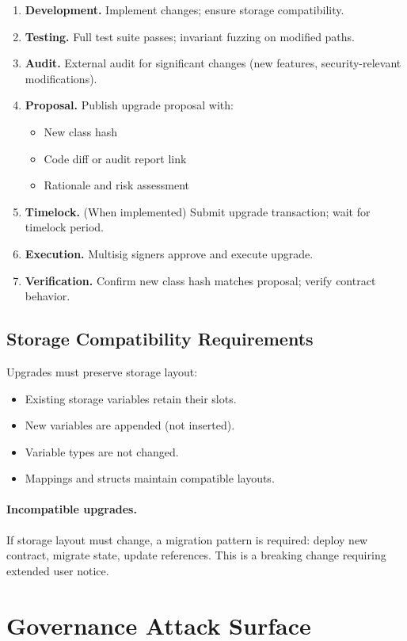 \begin{enumerate}
\item \textbf{Development.} Implement changes; ensure storage compatibility.
\item \textbf{Testing.} Full test suite passes; invariant fuzzing on modified paths.
\item \textbf{Audit.} External audit for significant changes (new features, security-relevant modifications).
\item \textbf{Proposal.} Publish upgrade proposal with:
\begin{itemize}
\item New class hash
\item Code diff or audit report link
\item Rationale and risk assessment
\end{itemize}
\item \textbf{Timelock.} (When implemented) Submit upgrade transaction; wait for timelock period.
\item \textbf{Execution.} Multisig signers approve and execute upgrade.
\item \textbf{Verification.} Confirm new class hash matches proposal; verify contract behavior.
\end{enumerate}

\subsection{Storage Compatibility Requirements}

Upgrades must preserve storage layout:
\begin{itemize}
\item Existing storage variables retain their slots.
\item New variables are appended (not inserted).
\item Variable types are not changed.
\item Mappings and structs maintain compatible layouts.
\end{itemize}

\paragraph{Incompatible upgrades.}
If storage layout must change, a migration pattern is required: deploy new contract, migrate state, update references. This is a breaking change requiring extended user notice.


\section{Governance Attack Surface}

